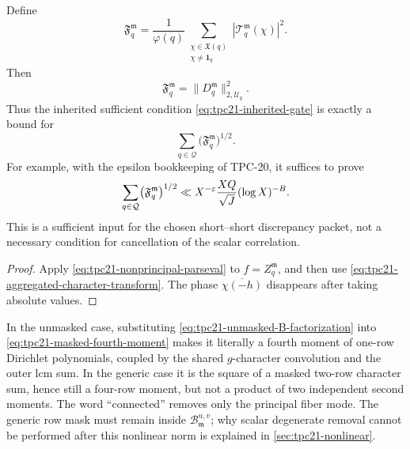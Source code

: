 \begin{theorem}
\label{thm:tpc21-exact-character-gate}
Define
\begin{equation}
 \mathfrak F_q^{\mathfrak m}
 =\frac1{\varphi(q)}
  \sum_{\substack{\chi\in\mathfrak X(q)\\\chi\ne\mathbf1_q}}
  |\mathcal T_q^{\mathfrak m}(\chi)|^2.
 \label{eq:tpc21-masked-fourth-moment}
\end{equation}
Then
\begin{equation}
 \boxed{
 \mathfrak F_q^{\mathfrak m}
 =\|D_q^{\mathfrak m}\|_{2,\mathcal U_q}^2.}
 \label{eq:tpc21-character-gate-identity}
\end{equation}
Thus the inherited sufficient condition
\eqref{eq:tpc21-inherited-gate} is exactly a bound for
\begin{equation}
 \sum_{q\in\mathcal Q}
 \bigl(\mathfrak F_q^{\mathfrak m}\bigr)^{1/2}.
 \label{eq:tpc21-family-character-gate}
\end{equation}
For example, with the epsilon bookkeeping of TPC-20, it suffices to
prove
\begin{equation}
 \sum_{q\in\mathcal Q}
 \bigl(\mathfrak F_q^{\mathfrak m}\bigr)^{1/2}
 \ll X^{-\varepsilon}\frac{XQ}{\sqrt J}(\log X)^{-B}.
 \label{eq:tpc21-sufficient-character-gate}
\end{equation}
This is a sufficient input for the chosen short--short discrepancy
packet, not a necessary condition for cancellation of the scalar
correlation.
\end{theorem}

\begin{proof}
Apply \eqref{eq:tpc21-nonprincipal-parseval} to
\(f=Z_q^{\mathfrak m}\), and then use
\eqref{eq:tpc21-aggregated-character-transform}.  The phase
\(\overline{\chi(-h)}\) disappears after taking absolute values.
\end{proof}

In the unmasked case, substituting
\eqref{eq:tpc21-unmasked-B-factorization} into
\eqref{eq:tpc21-masked-fourth-moment} makes it literally a fourth
moment of one-row Dirichlet polynomials, coupled by the shared
\(g\)-character convolution and the outer lcm sum.  In the generic
case it is the square of a masked two-row character sum, hence still a
four-row moment, but not a product of two independent second moments.
The word ``connected'' removes only the principal fiber mode.  The
generic row mask must remain inside
\(\mathcal B_{\mathfrak m}^{u,v}\); why scalar degenerate removal cannot
be performed after this nonlinear norm is explained in
\cref{sec:tpc21-nonlinear}.

